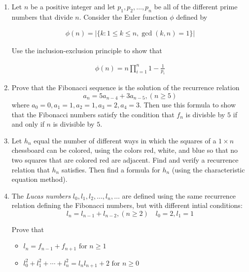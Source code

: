 \documentclass{report}
\begin{document}
{\begin{enumerate}
{              
          }

    \item Let $n$ be a positive integer and let $p_1, p_2, \dots, p_n$ be
          all of the different prime numbers that divide $n$. Consider the
          Euler function $\phi$ defined by

          \begin{align*}
              \phi(n) = \big | \{ k : 1 \le k \le n, \gcd{(k,n)} = 1 \} \big |
          \end{align*}

          Use the inclusion-exclusion principle to show that

          \begin{align*}
              \phi(n) = n \prod_{i=1}^{n} 1 - \frac{1}{p_i}
          \end{align*}

    \item Prove that the Fibonacci sequence is the solution of the
          recurrence relation $$ a_n = 5a_{n-4} + 3a_{n-5}, (n \ge 5)$$
          where $a_0=0, a_1=1, a_2=1, a_3=2, a_4=3$. Then use this formula
          to show that the Fibonacci numbers satisfy the condition that
          $f_n$ is divisble by $5$ if and only if $n$ is divisible by $5$.

    \item Let $h_n$ equal the number of different ways in which the
          squares of a $1 \times n$ chessboard can be colored, using the
          colors red, white, and blue so that no two squares that are
          colored red are adjacent. Find and verify a recurrence relation
          that $h_n$ satisfies. Then find a formula for $h_n$ (using the
          characteristic equation method).

    \item The \textit{Lucas numbers} $l_0, l_1, l_2, \dots, l_n, \dots$
          are defined using the same recurrence relation defining the
          Fibonacci numbers, but with different intial conditions:
          $$l_n = l_{n-1} + l_{n-2}, (n \ge 2) \quad l_0 = 2, l_1 = 1$$

          \noindent
          Prove that

          \begin{itemize}
              \item $l_n = f_{n-1} + f_{n+1} \text{ for } n \ge 1$
              \item $l_0^2 + l_1^2 + \cdots + l_n^2 = l_n l_{n+1} + 2 \text{ for } n \ge 0$
          \end{itemize}


\end{enumerate}}
\end{document}
